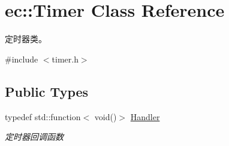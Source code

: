 \hypertarget{classec_1_1Timer}{\section{ec\-:\-:Timer Class Reference}
\label{classec_1_1Timer}
}


定时器类。  




{\ttfamily \#include $<$timer.\-h$>$}

\subsection*{Public Types}
\begin{DoxyCompactItemize}
\item 
\hypertarget{classec_1_1Timer_acbf2889a6472ca60ce4d3c8856b717c5}{typedef std\-::function$<$ void()$>$ \hyperlink{classec_1_1Timer_acbf2889a6472ca60ce4d3c8856b717c5}{Handler}}\label{classec_1_1Timer_acbf2889a6472ca60ce4d3c8856b717c5}

\begin{DoxyCompactList}\small\item\em 定时器回调函数 \end{DoxyCompactList}\end{DoxyCompactItemize}
